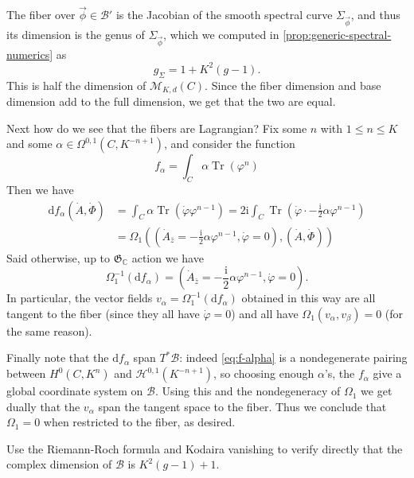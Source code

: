 \documentclass[12pt,letterpaper,reqno]{article}
\numberwithin{equation}{section}
\newcommand{\fG}{{\mathfrak G}}
\newcommand{\cB}{\ensuremath{\mathcal B}}
\newcommand{\cM}{\ensuremath{\mathcal M}}
\newcommand{\cH}{\ensuremath{\mathcal H}}
\newcommand{\C}{\ensuremath{\mathbb C}}
\newcommand{\I}{{\mathrm i}}
\newcommand{\de}{\mathrm{d}}
\DeclareMathOperator{\Tr}{Tr}
\begin{document}
\begin{pf} The fiber over $\vec\phi \in \cB'$ is the Jacobian of the
smooth spectral curve $\Sigma_{\vec\phi}$, and thus its dimension
is the genus of $\Sigma_{\vec\phi}$, which we computed in
\autoref{prop:generic-spectral-numerics} as
\begin{equation}
  g_{\Sigma} = 1 + K^2(g-1).
\end{equation}
This is half the dimension of $\cM_{K,d}(C)$.
Since the fiber dimension and base dimension add to the full dimension,
we get that the two are equal.

Next how do we see that the fibers are Lagrangian?
Fix some $n$ with $1 \le n \le K$ and some
$\alpha \in \Omega^{0,1}(C,K^{-n+1})$, and consider the function
\begin{equation} \label{eq:f-alpha}
  f_\alpha = \int_C \alpha \Tr(\varphi^n)
\end{equation}
Then we have
\begin{align}
 \de f_\alpha(\dot A, \dot \Phi) &= \int_C \alpha \Tr(\dot\varphi \varphi^{n-1}) = 2 \I \int_C \Tr\left(\dot\varphi \cdot -\frac{\I}{2} \alpha \varphi^{n-1} \right) \\
 &= \Omega_1\left((\dot{A}_{\bar z} = -\frac{\I}{2} \alpha \varphi^{n-1}, \dot\varphi = 0),(\dot A, \dot \Phi)\right)
\end{align}
Said otherwise, up to $\fG_\C$ action we have
\begin{equation}
  \Omega_1^{-1} (\de f_\alpha) = \left(\dot{A}_{\bar z} = -\frac{\I}{2} \alpha \varphi^{n-1}, \dot\varphi = 0\right).
\end{equation}
In particular, the vector fields $v_\alpha = \Omega_1^{-1}(\de f_\alpha)$
obtained in this way are all tangent to the fiber (since they all have
$\dot\varphi = 0$) and all have $\Omega_1(v_\alpha, v_\beta) = 0$ (for
the same reason).

Finally note that the $\de f_\alpha$ span $T^* \cB$: indeed
\eqref{eq:f-alpha} is a nondegenerate pairing between $H^0(C,K^n)$ and
$\cH^{0,1}(K^{-n+1})$, so choosing enough
$\alpha$'s, the $f_\alpha$ give a global coordinate system on
$\cB$. Using this and the nondegeneracy of $\Omega_1$
we get dually that the $v_\alpha$ span the tangent space to the
fiber. Thus we conclude that $\Omega_1 = 0$ when restricted to the fiber, as
desired.
\end{pf}

\begin{exercise} Use the Riemann-Roch formula and Kodaira vanishing
to verify directly that the complex dimension of $\cB$ is $K^2(g-1)+1$.
\end{exercise}
\end{document}
